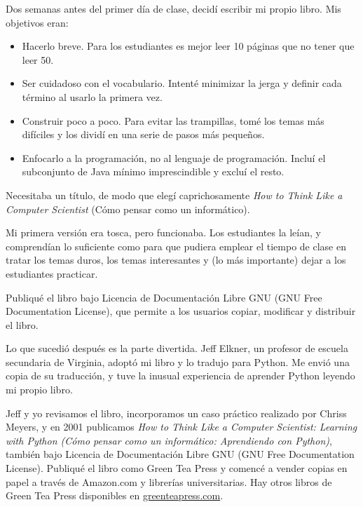 Dos semanas antes del primer día de clase, decidí escribir mi
propio libro.
Mis objetivos eran:

\begin{itemize}

\item Hacerlo breve. Para los estudiantes es mejor leer 10 páginas
que no tener que leer 50.

\item Ser cuidadoso con el vocabulario. Intenté minimizar la jerga
y definir cada término al usarlo la primera vez.

\item Construir poco a poco. Para evitar las trampillas, tomé los temas
más difíciles y los dividí en una serie de pasos más pequeños.

\item Enfocarlo a la programación, no al lenguaje de programación. Incluí
el subconjunto de Java mínimo imprescindible y excluí el resto.

\end{itemize}

Necesitaba un título, de modo que elegí caprichosamente \emph{How to Think Like
a Computer Scientist} (Cómo pensar como un informático).

Mi primera versión era tosca, pero funcionaba. Los estudiantes la leían,
y comprendían lo suficiente como para que pudiera emplear el tiempo de clase
en tratar los temas duros, los temas interesantes y (lo más importante) dejar a los
estudiantes practicar.

Publiqué el libro bajo Licencia de Documentación Libre GNU (GNU Free Documentation License),
que permite a los usuarios copiar, modificar y distribuir el libro.


Lo que sucedió después es la parte divertida. Jeff Elkner, un profesor
de escuela secundaria de Virginia, adoptó mi libro y lo tradujo para
Python. Me envió una copia de su traducción, y tuve la inusual
experiencia de aprender Python leyendo mi propio libro.

Jeff y yo revisamos el libro, incorporamos un caso práctico realizado por
Chriss Meyers, y en 2001 publicamos \emph{How to Think Like
a Computer Scientist: Learning with Python (Cómo pensar como un informático:
Aprendiendo con Python)}, también bajo
Licencia de Documentación Libre GNU (GNU Free Documentation License).
Publiqué el libro como Green Tea Press y comencé a vender
copias en papel a través de Amazon.com y librerías universitarias.
Hay otros libros de Green Tea Press disponibles en
\url{greenteapress.com}.

